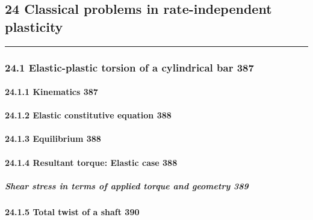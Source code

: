 \hypertarget{classical-problems-in-rate-independent-plasticity}{%
\subsection{24 Classical problems in rate-independent
plasticity}\label{classical-problems-in-rate-independent-plasticity}}

\begin{center}\rule{0.5\linewidth}{0.5pt}\end{center}

\hypertarget{elastic-plastic-torsion-of-a-cylindrical-bar-387}{%
\subsubsection{24.1 Elastic-plastic torsion of a cylindrical bar
387}\label{elastic-plastic-torsion-of-a-cylindrical-bar-387}}

\hypertarget{kinematics-387}{%
\paragraph{24.1.1 Kinematics 387}\label{kinematics-387}}

\hypertarget{elastic-constitutive-equation-388}{%
\paragraph{24.1.2 Elastic constitutive equation
388}\label{elastic-constitutive-equation-388}}

\hypertarget{equilibrium-388}{%
\paragraph{24.1.3 Equilibrium 388}\label{equilibrium-388}}

\hypertarget{resultant-torque-elastic-case-388}{%
\paragraph{24.1.4 Resultant torque: Elastic case
388}\label{resultant-torque-elastic-case-388}}

\hypertarget{shear-stress-in-terms-of-applied-torque-and-geometry-389}{%
\subparagraph{Shear stress in terms of applied torque and geometry
389}\label{shear-stress-in-terms-of-applied-torque-and-geometry-389}}

\hypertarget{total-twist-of-a-shaft-390}{%
\paragraph{24.1.5 Total twist of a shaft
390}\label{total-twist-of-a-shaft-390}}

